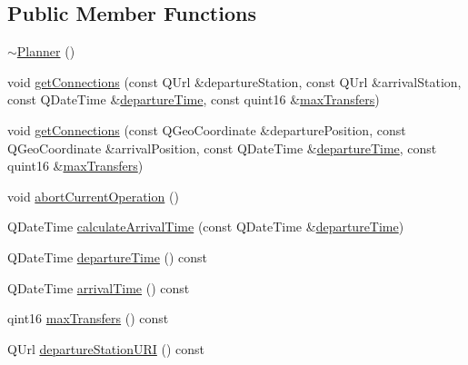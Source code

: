 \subsection*{Public Member Functions}
\begin{DoxyCompactItemize}
\item 
\mbox{\hyperlink{classQRail_1_1RouterEngine_1_1Planner_a3ef159b1f214b7e7f2aecb94d1a2bbed}{$\sim$\+Planner}} ()
\item 
void \mbox{\hyperlink{classQRail_1_1RouterEngine_1_1Planner_aad16ab26f3de5ffd3193c97479b84a95}{get\+Connections}} (const Q\+Url \&departure\+Station, const Q\+Url \&arrival\+Station, const Q\+Date\+Time \&\mbox{\hyperlink{classQRail_1_1RouterEngine_1_1Planner_af4816b0cc2e734bacb89d14c682ea7c5}{departure\+Time}}, const quint16 \&\mbox{\hyperlink{classQRail_1_1RouterEngine_1_1Planner_ab9a0ae139db0618220d8d069e983c394}{max\+Transfers}})
\item 
void \mbox{\hyperlink{classQRail_1_1RouterEngine_1_1Planner_ade8a2f54fea0e510bc379a5d537c67ea}{get\+Connections}} (const Q\+Geo\+Coordinate \&departure\+Position, const Q\+Geo\+Coordinate \&arrival\+Position, const Q\+Date\+Time \&\mbox{\hyperlink{classQRail_1_1RouterEngine_1_1Planner_af4816b0cc2e734bacb89d14c682ea7c5}{departure\+Time}}, const quint16 \&\mbox{\hyperlink{classQRail_1_1RouterEngine_1_1Planner_ab9a0ae139db0618220d8d069e983c394}{max\+Transfers}})
\item 
void \mbox{\hyperlink{classQRail_1_1RouterEngine_1_1Planner_a6098ae8b5db4f0c9cfe4352486ac4fc1}{abort\+Current\+Operation}} ()
\item 
Q\+Date\+Time \mbox{\hyperlink{classQRail_1_1RouterEngine_1_1Planner_aaccb9c969c39304363886cf4a75a033c}{calculate\+Arrival\+Time}} (const Q\+Date\+Time \&\mbox{\hyperlink{classQRail_1_1RouterEngine_1_1Planner_af4816b0cc2e734bacb89d14c682ea7c5}{departure\+Time}})
\item 
Q\+Date\+Time \mbox{\hyperlink{classQRail_1_1RouterEngine_1_1Planner_af4816b0cc2e734bacb89d14c682ea7c5}{departure\+Time}} () const
\item 
Q\+Date\+Time \mbox{\hyperlink{classQRail_1_1RouterEngine_1_1Planner_adf7dbcaa92080558d1146422967d2cde}{arrival\+Time}} () const
\item 
qint16 \mbox{\hyperlink{classQRail_1_1RouterEngine_1_1Planner_ab9a0ae139db0618220d8d069e983c394}{max\+Transfers}} () const
\item 
Q\+Url \mbox{\hyperlink{classQRail_1_1RouterEngine_1_1Planner_a6cd264c862d10323717ca3b978797d2e}{departure\+Station\+U\+RI}} () const

\end{DoxyCompactItemize}
